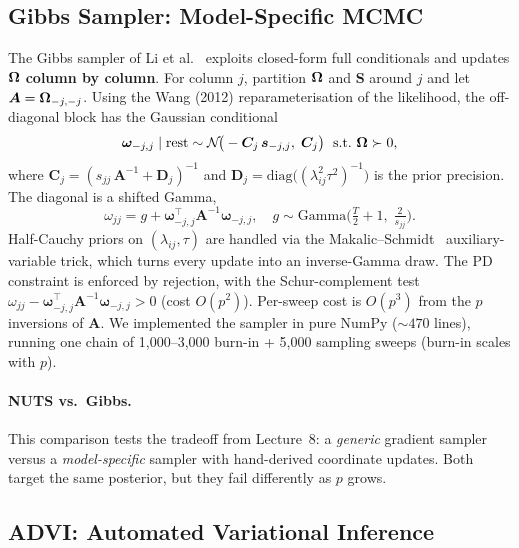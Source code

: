 \documentclass[10pt,conference,compsoc]{IEEEtran}
\newcommand{\Normal}{\mathcal{N}} \newcommand{\HalfCauchy}{\mathrm{C}^{+}} \newcommand{\InvGamma}{\mathrm{IG}}
\begin{document}
\subsection{Gibbs Sampler: Model-Specific MCMC}

The Gibbs sampler of Li et al.~\cite{li2019} exploits closed-form full conditionals and updates $\bm{\Omega}$ \textbf{column by column}. For column $j$, partition $\bm{\Omega}$ and $\bm{S}$ around $j$ and let $\bm{A} = \bm{\Omega}_{-j,-j}$. Using the Wang (2012) reparameterisation of the likelihood, the off-diagonal block has the Gaussian conditional
\begin{equation}
  \bm{\omega}_{-j,j} \mid \text{rest} \sim \Normal\!\big(-\bm{C}_j\,\bm{s}_{-j,j},\;\bm{C}_j\big)\;\text{ s.t.\ }\bOmega \succ 0,
  \label{eq:gibbs-offdiag}
\end{equation}
where $\bm{C}_j = (s_{jj}\,\bm{A}^{-1} + \bm{D}_j)^{-1}$ and $\bm{D}_j = \mathrm{diag}\big((\lambda_{ij}^2\tau^2)^{-1}\big)$ is the prior precision. The diagonal is a shifted Gamma,
\begin{equation}
  \omega_{jj} = g + \bm{\omega}_{-j,j}^\top\bm{A}^{-1}\bm{\omega}_{-j,j},\quad g \sim \mathrm{Gamma}\!\big(\tfrac{T}{2}{+}1,\; \tfrac{2}{s_{jj}}\big).
  \label{eq:gibbs-diag}
\end{equation}
Half-Cauchy priors on $(\lambda_{ij}, \tau)$ are handled via the Makalic--Schmidt~\cite{makalic2016} auxiliary-variable trick, which turns every update into an inverse-Gamma draw. The PD constraint is enforced by rejection, with the Schur-complement test $\omega_{jj} - \bm{\omega}_{-j,j}^\top\bm{A}^{-1}\bm{\omega}_{-j,j} > 0$ (cost $O(p^2)$). Per-sweep cost is $O(p^3)$ from the $p$ inversions of $\bm{A}$. We implemented the sampler in pure NumPy (${\sim}470$ lines), running one chain of 1{,}000--3{,}000 burn-in + 5{,}000 sampling sweeps (burn-in scales with $p$).

\paragraph{NUTS vs.\ Gibbs.} This comparison tests the tradeoff from Lecture~8: a \emph{generic} gradient sampler versus a \emph{model-specific} sampler with hand-derived coordinate updates. Both target the same posterior, but they fail differently as $p$ grows.

\subsection{ADVI: Automated Variational Inference}
\end{document}
